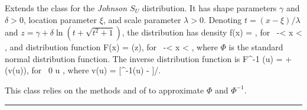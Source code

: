
Extends the class  for
the {\em Johnson $S_U$\/} distribution.
It  has shape parameters $\gamma$ and $\delta > 0$, location parameter
$\xi$, and scale parameter $\lambda > 0$.
Denoting $t=(x-\xi)/\lambda$ and
$z = \gamma + \delta\ln\left(t + \sqrt{t^2 + 1}\right)$,
the distribution has density
%
\eq
 f(x) = {\lambda{}}
  \html{)},
 \qquad  \mbox{for } -\infty < x < \infty,
\endeq
%
and distribution function
\eq
 F(x) = \Phi(z), \qquad  \mbox{for } -\infty < x < \infty,
\endeq
where $\Phi$ is the standard normal distribution function.
The inverse distribution function is
\eq
 F^{-1} (u) = \xi + \lambda \sinh(v(u)),  \qquad\mbox{for }  0 \le u ,
\endeq
where
\eq
  v(u) = [\Phi^{-1}(u) - \gamma]/\delta.
\endeq

This class relies on the methods   and
    of  to
  approximate $\Phi$ and $\Phi^{-1}$.


\bigskip\hrule

